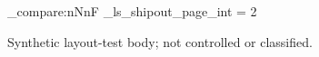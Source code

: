\documentclass{linearspace-legal}
\begin{document}
\LSMakeLegalTitle
\ExplSyntaxOn
\int_compare:nNnF {\g_ls_shipout_page_int} = {2}
  {\PackageError{linearspace-test}{Full-combination~legal~cover~and~required~release-notice~page~count~regression}{}}
\ExplSyntaxOff
Synthetic layout-test body; not controlled or classified.
\end{document}
